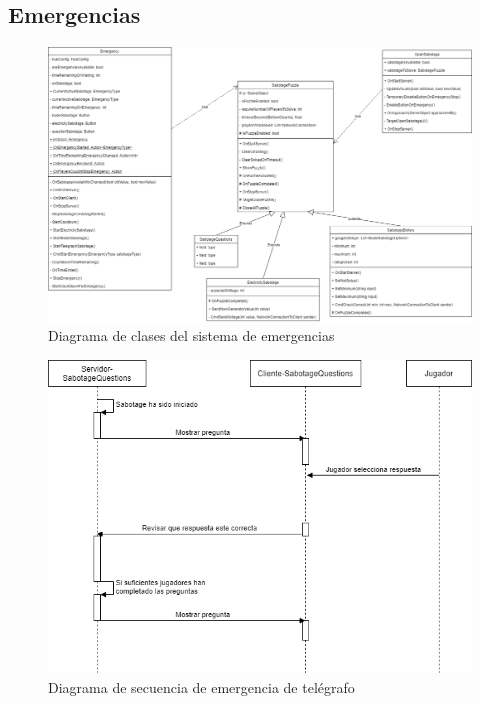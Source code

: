 \subsection{Emergencias}
\begin{figure}[h]
    \centering
    \includegraphics[width=1\linewidth]{images/DiagramaClasesEmergencias.png}
    \caption{Diagrama de clases del sistema de emergencias}
    \label{fig:diagrama_clases_emergencias}
\end{figure}
\begin{figure}[p]
            \centering
            \includegraphics[width=1\linewidth]{images/diagrama_secuencia_sabotage_preguntas.png}
            \caption{Diagrama de secuencia de emergencia de telégrafo}
            \label{fig:diagrama_secuencia_emergencia_pregunta}
        \end{figure}
